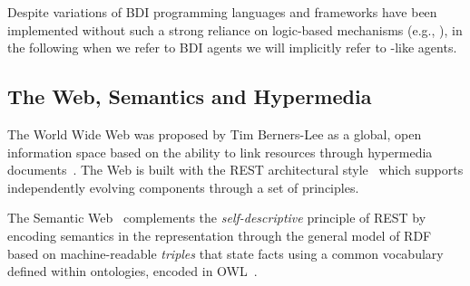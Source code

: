 \documentclass[
]{ceurart}
\begin{document}
%
Despite variations of \ac{BDI} programming languages and frameworks have been implemented without such a strong reliance on logic-based mechanisms (e.g., \cite{map2005sp,kampik2019emas}), in the following when we refer to \ac{BDI} agents we will implicitly refer to \agentspeak{}-like agents.

\subsection{The Web, Semantics and Hypermedia}

The World Wide Web was proposed by Tim Berners-Lee as a global, open information space
based on the ability to link resources through hypermedia documents~\cite{DBLP:journals/cn/Berners-LeeCG92}.
%
The Web is built with the \ac{REST} architectural style~\cite{DBLP:journals/toit/FieldingT02}
which supports independently evolving components through a set of principles.
%

The Semantic Web~\cite{BernersLee2001} complements the \emph{self-descriptive} principle of \ac{REST} 
by encoding semantics in the representation through the general model of \ac{RDF}~\cite{RDF_Concepts_W3C:14}
based on machine-readable \emph{triples}
that state facts using a common vocabulary defined within ontologies, encoded in {OWL}~\cite{OWL_Syntax_W3C:12}.
%
\end{document}
